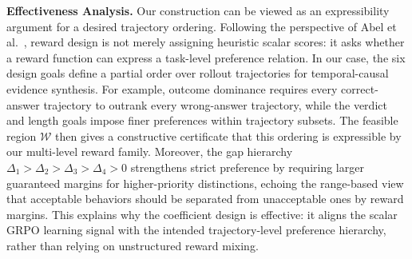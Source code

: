 \noindent\textbf{Effectiveness Analysis.}
Our construction can be viewed as an expressibility argument for a desired
trajectory ordering. Following the perspective of
Abel et al.~\citep{abel2021expressivity}, reward design is not merely assigning
heuristic scalar scores: it asks whether a reward function can express a
task-level preference relation. In our case, the six design goals define a
partial order over rollout trajectories for temporal-causal evidence synthesis.
For example, outcome dominance requires every correct-answer trajectory to
outrank every wrong-answer trajectory, while the verdict and length goals impose
finer preferences within trajectory subsets. The feasible region $\mathcal{W}$
then gives a constructive certificate that this ordering is expressible by our
multi-level reward family. Moreover, the gap hierarchy
$\Delta_1>\Delta_2>\Delta_3>\Delta_4>0$ strengthens strict preference by
requiring larger guaranteed margins for higher-priority distinctions, echoing
the range-based view that acceptable behaviors should be separated from
unacceptable ones by reward margins. This explains why the coefficient design is
effective: it aligns the scalar GRPO learning signal with the intended
trajectory-level preference hierarchy, rather than relying on unstructured
reward mixing.
